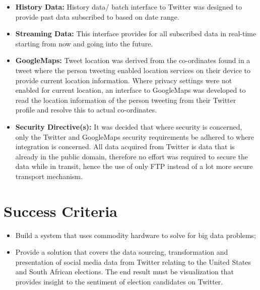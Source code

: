 \documentclass[12pt]{article} %
\begin{document}
\begin{itemize} 
	\item \textbf{History Data:} History data/ batch interface to Twitter was designed to provide past data subscribed to based on date range.
	
	\item \textbf{Streaming Data:} 
	This interface provides for all subscribed data in real-time starting from now and going into the future.
	
	\item \textbf{GoogleMaps:} 
	Tweet location was derived from the co-ordinates found in a tweet where the person tweeting enabled location services on their device to provide current location information. Where privacy settings were not enabled for current location, an interface to GoogleMaps was developed to read the location information of the person tweeting from their Twitter profile and resolve this to actual co-ordinates.
	
	\item \textbf{Security Directive(s):} 
	It was decided that where security is concerned, only the Twitter and GoogleMaps security requirements be adhered to where integration is concerned. All data acquired from Twitter is data that is already in the public domain, therefore no effort was required to secure the data while in transit, hence the use of only FTP instead of a lot more secure transport mechanism.
\end{itemize}
	
	
	

	
	
	

	
	
	
	\section{Success Criteria} %
	
	\begin{itemize}
		\item Build a system that uses commodity hardware to solve for big data problems;
		\item Provide a solution that covers the data sourcing, transformation and presentation of social media data from Twitter relating to the United States and South African elections. The end result must be visualization that provides insight to the sentiment of election candidates on Twitter.
	\end{itemize}
	
\end{document}
